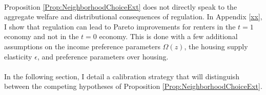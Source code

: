 \documentclass[11pt]{article}
\begin{document}
	\paragraph*{}
	Proposition \ref{Prop:NeighborhoodChoiceExt} does not directly speak to the aggregate welfare and distributional consequences of regulation. In Appendix \ref{xx}, I show that regulation can lead to Pareto improvements for renters in the $t = 1$ economy and not in the $t = 0$ economy. This is done with a few additional assumptions on the income preference parameters $\Omega(z)$, the housing supply elasticity $\epsilon$, and preference parameters over housing.
	
	\paragraph*{}
	In the following section, I detail a calibration strategy that will distinguish between the competing hypotheses of Proposition \ref{Prop:NeighborhoodChoiceExt}. 
	
\end{document}
